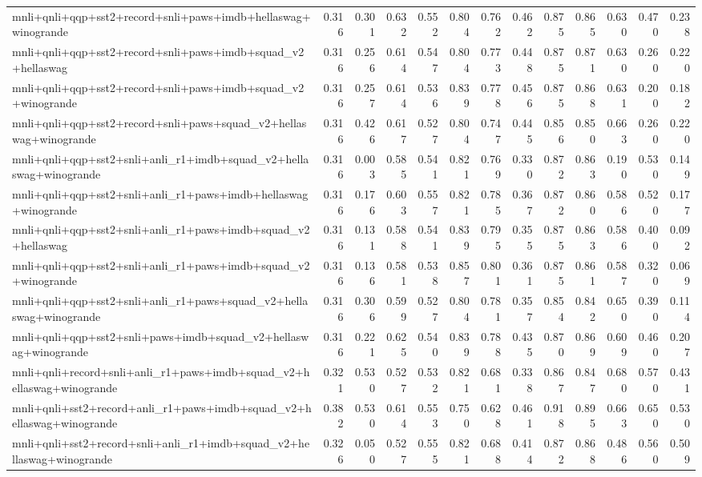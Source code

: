\begin{table}[t]
\begin{tabular}{lrrrrrrrrrrrr}
    mnli+qnli+qqp+sst2+record+snli+paws+imdb+hellaswag+winogrande & 0.316 & 0.301 & 0.632 & 0.552 & 0.804 & 0.762 & 0.462 & 0.875 & 0.865 & 0.630 & 0.470 & 0.238 \\
    mnli+qnli+qqp+sst2+record+snli+paws+imdb+squad\_v2+hellaswag & 0.316 & 0.256 & 0.614 & 0.547 & 0.804 & 0.773 & 0.448 & 0.875 & 0.871 & 0.630 & 0.260 & 0.220 \\
    mnli+qnli+qqp+sst2+record+snli+paws+imdb+squad\_v2+winogrande & 0.316 & 0.257 & 0.614 & 0.536 & 0.839 & 0.778 & 0.456 & 0.875 & 0.868 & 0.631 & 0.200 & 0.182 \\
    mnli+qnli+qqp+sst2+record+snli+paws+squad\_v2+hellaswag+winogrande & 0.316 & 0.426 & 0.617 & 0.527 & 0.804 & 0.747 & 0.445 & 0.856 & 0.850 & 0.663 & 0.260 & 0.220 \\
    mnli+qnli+qqp+sst2+snli+anli\_r1+imdb+squad\_v2+hellaswag+winogrande & 0.316 & 0.003 & 0.585 & 0.541 & 0.821 & 0.769 & 0.330 & 0.872 & 0.863 & 0.190 & 0.530 & 0.149 \\
    mnli+qnli+qqp+sst2+snli+anli\_r1+paws+imdb+hellaswag+winogrande & 0.316 & 0.176 & 0.603 & 0.557 & 0.821 & 0.785 & 0.367 & 0.872 & 0.860 & 0.586 & 0.520 & 0.177 \\
    mnli+qnli+qqp+sst2+snli+anli\_r1+paws+imdb+squad\_v2+hellaswag & 0.316 & 0.131 & 0.588 & 0.541 & 0.839 & 0.795 & 0.355 & 0.875 & 0.863 & 0.586 & 0.400 & 0.092 \\
    mnli+qnli+qqp+sst2+snli+anli\_r1+paws+imdb+squad\_v2+winogrande & 0.316 & 0.136 & 0.581 & 0.538 & 0.857 & 0.801 & 0.361 & 0.875 & 0.861 & 0.587 & 0.320 & 0.069 \\
    mnli+qnli+qqp+sst2+snli+anli\_r1+paws+squad\_v2+hellaswag+winogrande & 0.316 & 0.306 & 0.599 & 0.527 & 0.804 & 0.781 & 0.357 & 0.854 & 0.842 & 0.650 & 0.390 & 0.114 \\
    mnli+qnli+qqp+sst2+snli+paws+imdb+squad\_v2+hellaswag+winogrande & 0.316 & 0.221 & 0.625 & 0.540 & 0.839 & 0.788 & 0.435 & 0.870 & 0.869 & 0.609 & 0.460 & 0.207 \\
    mnli+qnli+record+snli+anli\_r1+paws+imdb+squad\_v2+hellaswag+winogrande & 0.321 & 0.530 & 0.527 & 0.532 & 0.821 & 0.681 & 0.338 & 0.867 & 0.847 & 0.680 & 0.570 & 0.431 \\
    mnli+qnli+sst2+record+anli\_r1+paws+imdb+squad\_v2+hellaswag+winogrande & 0.382 & 0.530 & 0.614 & 0.553 & 0.750 & 0.628 & 0.461 & 0.918 & 0.895 & 0.663 & 0.650 & 0.530 \\
    mnli+qnli+sst2+record+snli+anli\_r1+imdb+squad\_v2+hellaswag+winogrande & 0.326 & 0.050 & 0.527 & 0.555 & 0.821 & 0.688 & 0.414 & 0.872 & 0.868 & 0.486 & 0.560 & 0.509 \\

\end{tabular}
\end{table}
